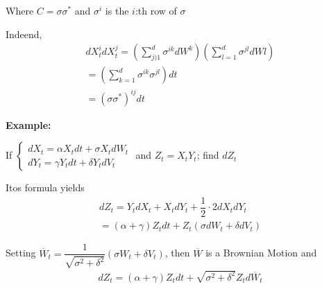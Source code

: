 \noindent Where $C = \sigma\sigma^*$ and $\sigma^i$ is the $i$:th row of $\sigma$\par
\noindent Indeend, 
\begin{equation*}
  \begin{gathered}
    dX_t^idX_t^j = \left(\sum_{j)1}^{d}\sigma^{ik}dW^k\right)\left(\sum_{l=1}^{d}\sigma^{jl}dWl\right)\\
    = \left(\sum_{k=1}^{d}\sigma^{ik}\sigma^{jl}\right)dt\\
    = (\sigma\sigma^*)^{ij}dt
  \end{gathered}
\end{equation*}
\par\bigskip
\noindent\textbf{Example:}\par
\noindent If $\begin{cases}
  dX_t = \alpha X_tdt+\sigma X_tdW_t\\ dY_t = \gamma Y_tdt+\delta Y_tdV_t
\end{cases}$ and $Z_t = X_tY_t$; find $dZ_t$
\par\bigskip
\noindent Itos formula yields
\begin{equation*}
  \begin{gathered}
    dZ_t = Y_tdX_t + X_tdY_t+\dfrac{1}{2}\cdot2dX_tdY_t\\
    = \left(\alpha+\gamma\right)Z_tdt + Z_t(\sigma d W_t+\delta dV_t)
  \end{gathered}
\end{equation*}\par
\noindent Setting $\overline{W}_t = \dfrac{1}{\sqrt{\sigma^2+\delta^2}}(\sigma W_t+\delta V_t)$, then $\overline{W}$ is a Brownian Motion and 
\begin{equation*}
  \begin{gathered}
    dZ_t = \left(\alpha+\gamma\right)Z_tdt + \sqrt{\sigma^2+\delta^2}Z_td\overline{W}_t
  \end{gathered}
\end{equation*}
\par\bigskip
